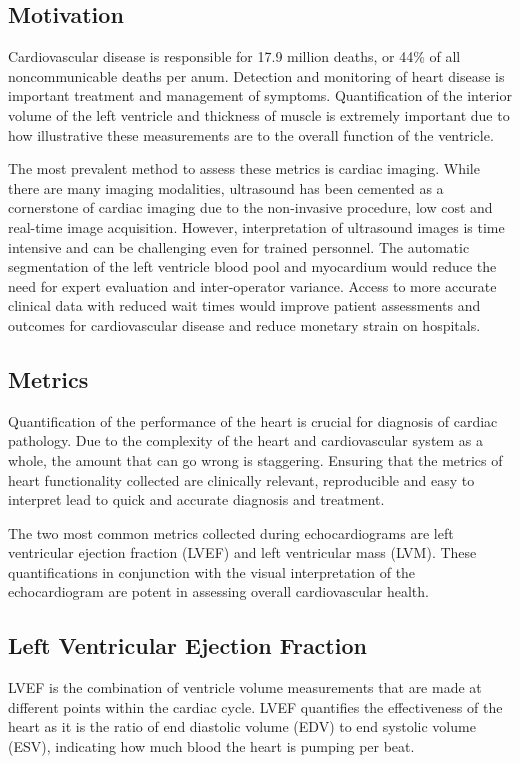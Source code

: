 \documentclass[12pt]{article}
\begin{document}
\subsection{Motivation}
Cardiovascular disease is responsible for 17.9 million deaths, or 44\% of all noncommunicable deaths per anum\cite{who_world_health}.
Detection and monitoring of heart disease is important treatment and management of symptoms. %
Quantification of the interior volume of the left ventricle and thickness of muscle is extremely important due to how illustrative these measurements are to the overall function of the ventricle.\cite{ase_chamber_quant}
\par
The most prevalent method to assess these metrics is cardiac imaging.
While there are many imaging modalities, ultrasound has been cemented as a cornerstone of cardiac imaging due to the non-invasive procedure, low cost and real-time image acquisition.
However, interpretation of ultrasound images is time intensive and can be challenging even for trained personnel.
The automatic segmentation of the left ventricle blood pool and myocardium
would reduce the need for expert evaluation and inter-operator variance. %
Access to more accurate clinical data with reduced wait times would improve patient assessments and outcomes for cardiovascular disease and reduce monetary strain on hospitals.
\subsection{Metrics}
Quantification of the performance of the heart is crucial for diagnosis of cardiac pathology.
Due to the complexity of the heart and cardiovascular system as a whole, the amount that can go wrong is staggering.
Ensuring that the metrics of heart functionality collected are clinically relevant, reproducible and easy to interpret lead to quick and accurate diagnosis and treatment. 

The two most common metrics collected during echocardiograms are left ventricular ejection fraction (LVEF) and left ventricular mass (LVM).\cite{cardiac_chamber_quant_update}
These quantifications in conjunction with the visual interpretation of the echocardiogram are potent in assessing overall cardiovascular health.

\subsection{Left Ventricular Ejection Fraction}
LVEF is the combination of ventricle volume measurements that are made at different points within the cardiac cycle.
LVEF quantifies the effectiveness of the heart as it is the ratio of end diastolic volume (EDV) to end systolic volume (ESV), indicating how much blood the heart is pumping per beat.
\end{document}
